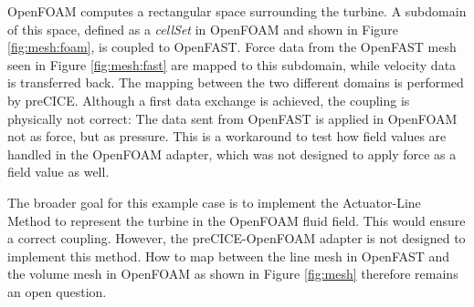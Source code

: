 OpenFOAM computes a rectangular space surrounding the turbine. A subdomain of this space, defined as a \textit{cellSet} in OpenFOAM and shown in Figure \ref{fig:mesh:foam}, is coupled to OpenFAST. Force data from the OpenFAST mesh seen in Figure \ref{fig:mesh:fast} are mapped to this subdomain, while velocity data is transferred back. The mapping between the two different domains is performed by preCICE. Although a first data exchange is achieved, the coupling is physically not correct: The data sent from OpenFAST is applied in OpenFOAM not as force, but as pressure. This is a workaround to test how field values are handled in the OpenFOAM adapter, which was not designed to apply force as a field value as well.

The broader goal for this example case is to implement the Actuator-Line Method to represent the turbine in the OpenFOAM fluid field. This would ensure a correct coupling. However, the preCICE-OpenFOAM adapter is not designed to implement this method. How to map between the line mesh in OpenFAST and the volume mesh in OpenFOAM as shown in Figure \ref{fig:mesh} therefore remains an open question.

